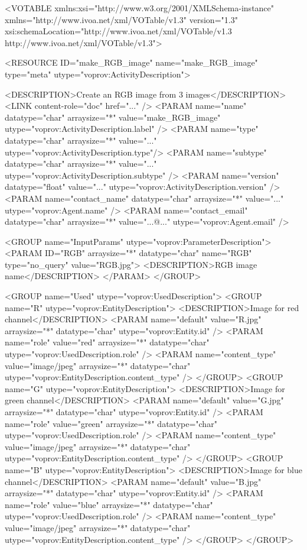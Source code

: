\begin{verbnobox}[\scriptsize]

<VOTABLE xmlns:xsi="http://www.w3.org/2001/XMLSchema-instance" 
    xmlns="http://www.ivoa.net/xml/VOTable/v1.3" version="1.3" 
    xsi:schemaLocation="http://www.ivoa.net/xml/VOTable/v1.3 
    http://www.ivoa.net/xml/VOTable/v1.3">
    
  <RESOURCE ID="make_RGB_image" name="make_RGB_image" 
      type="meta" utype="voprov:ActivityDescription">
      
    <DESCRIPTION>Create an RGB image from 3 images</DESCRIPTION>
    <LINK content-role="doc" href="..." />
    <PARAM name="name" datatype="char" arraysize="*" 
        value="make_RGB_image" utype="voprov:ActivityDescription.label" />
    <PARAM name="type" datatype="char" arraysize="*" 
        value="..." utype="voprov:ActivityDescription.type"/>
    <PARAM name="subtype" datatype="char" arraysize="*" 
        value="..." utype="voprov:ActivityDescription.subtype" />
    <PARAM name="version" datatype="float" 
        value="..." utype="voprov:ActivityDescription.version" />
    <PARAM name="contact_name" datatype="char" arraysize="*" 
        value="..." utype="voprov:Agent.name" />
    <PARAM name="contact_email" datatype="char" arraysize="*" 
        value="...@..." utype="voprov:Agent.email" />
        
    <GROUP name="InputParams" utype="voprov:ParameterDescription">
      <PARAM ID="RGB" arraysize="*" datatype="char" name="RGB" 
          type="no_query" value="RGB.jpg">
        <DESCRIPTION>RGB image name</DESCRIPTION>
      </PARAM>
    </GROUP>
		
    <GROUP name="Used" utype="voprov:UsedDescription">
      <GROUP name="R" utype="voprov:EntityDescription">
        <DESCRIPTION>Image for red channel</DESCRIPTION>
        <PARAM name="default" value="R.jpg" arraysize="*" datatype="char" 
            utype="voprov:Entity.id" />
        <PARAM name="role" value="red" arraysize="*" datatype="char" 
            utype="voprov:UsedDescription.role" />
        <PARAM name="content_type" value="image/jpeg" arraysize="*" datatype="char" 
            utype="voprov:EntityDescription.content_type" />
      </GROUP>
      <GROUP name="G" utype="voprov:EntityDescription">
        <DESCRIPTION>Image for green channel</DESCRIPTION>
        <PARAM name="default" value="G.jpg" arraysize="*" datatype="char" 
            utype="voprov:Entity.id" />
        <PARAM name="role" value="green" arraysize="*" datatype="char" 
            utype="voprov:UsedDescription.role" />
        <PARAM name="content_type" value="image/jpeg" arraysize="*" datatype="char" 
           utype="voprov:EntityDescription.content_type" />
      </GROUP>
      <GROUP name="B" utype="voprov:EntityDescription">
        <DESCRIPTION>Image for blue channel</DESCRIPTION>
        <PARAM name="default" value="B.jpg" arraysize="*" datatype="char" 
            utype="voprov:Entity.id" />
        <PARAM name="role" value="blue" arraysize="*" datatype="char" 
            utype="voprov:UsedDescription.role" />
        <PARAM name="content_type" value="image/jpeg" arraysize="*" datatype="char" 
            utype="voprov:EntityDescription.content_type" />
      </GROUP>
    </GROUP>
    

\end{verbnobox}

